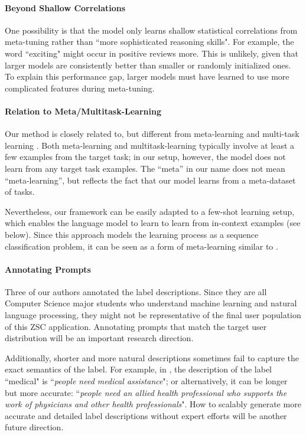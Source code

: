 \paragraph{Beyond Shallow Correlations} One possibility is that the model only learns shallow statistical correlations from meta-tuning rather than ``more sophisticated reasoning skills". For example, the word ``exciting" might occur in positive reviews more. This is unlikely, given that larger models are consistently better than smaller or randomly initialized ones. To explain this performance gap, larger models must have learned to use more complicated features during meta-tuning.

\paragraph{Relation to Meta/Multitask-Learning} Our method is closely related to, but different from meta-learning \cite{yin2020meta, murtydreca} and multi-task learning \cite{DBLP:journals/corr/abs-2104-08835, aghajanyan2021muppet}. Both meta-learning and multitask-learning typically involve at least a few examples from the target task; in our setup, however, the model does not learn from any target task examples. The “meta” in our name does not mean “meta-learning”, but reflects the fact that our model learns from a meta-dataset of tasks. 

Nevertheless, our framework can be easily adapted to a few-shot learning setup, which enables the language model to learn to learn from in-context examples (see below). Since this approach models the learning process as a sequence classification problem, it can be seen as a form of meta-learning similar to \cite{ravi2016optimization}.

\paragraph{Annotating Prompts} Three of our authors annotated the label descriptions. Since they are all Computer Science major students who understand machine learning and natural language processing, they might not be representative of the final user population of this ZSC application. Annotating prompts that match the target user distribution will be an important research direction. 

Additionally, shorter and more natural descriptions sometimes fail to capture the exact semantics of the label. For example, in \citet{yin-etal-2019-benchmarking}, the description of the label ``medical" is ``\textit{people need medical assistance}"; or alternatively, it can be longer but more accurate: ``\textit{people need an allied health professional who supports the work of physicians and other health professionals}". How to scalably generate more accurate and detailed label descriptions without expert efforts will be another future direction. 

